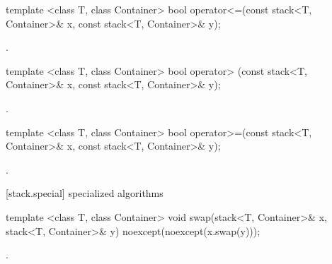 %
\begin{itemdecl}
template <class T, class Container>
    bool operator<=(const stack<T, Container>& x,
                    const stack<T, Container>& y);
\end{itemdecl}

\begin{itemdescr}
\pnum
\returns
{}.
\end{itemdescr}

%
\begin{itemdecl}
template <class T, class Container>
    bool operator> (const stack<T, Container>& x,
                    const stack<T, Container>& y);
\end{itemdecl}

\begin{itemdescr}
\pnum
\returns
{}.
\end{itemdescr}

%
\begin{itemdecl}
template <class T, class Container>
    bool operator>=(const stack<T, Container>& x,
                    const stack<T, Container>& y);
\end{itemdecl}

\begin{itemdescr}
\pnum
\returns
{}.
\end{itemdescr}

[stack.special]{ specialized algorithms}

%
%
\begin{itemdecl}
template <class T, class Container>
  void swap(stack<T, Container>& x, stack<T, Container>& y) noexcept(noexcept(x.swap(y)));
\end{itemdecl}

\begin{itemdescr}
\pnum
\effects {}.
\end{itemdescr}
